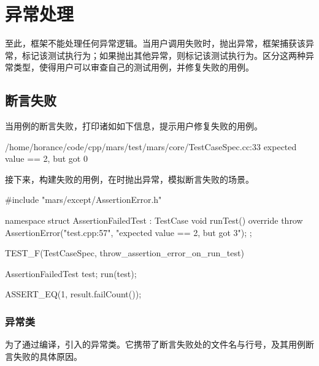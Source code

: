 \section{异常处理}

\begin{content}

至此，框架不能处理任何异常逻辑。当用户调用失败时，抛出异常，框架捕获该异常，标记该测试执行为；如果抛出其他异常，则标记该测试执行为。区分这两种异常类型，使得用户可以审查自己的测试用例，并修复失败的用例。

\subsection{断言失败}

当用例的断言失败，打印诸如如下信息，提示用户修复失败的用例。

\begin{leftbar}
 \begin{python}[caption={测试失败}]
/home/horance/code/cpp/mars/test/mars/core/TestCaseSpec.cc:33
expected value == 2, but got 0
 \end{python}
\end{leftbar}

接下来，构建失败的用例，在时抛出异常，模拟断言失败的场景。

\begin{leftbar}
 \begin{c++}[caption={\ttfamily{test/mars/TestCaseSpec.cc}}]
#include "mars/except/AssertionError.h"

namespace {
  struct AssertionFailedTest : TestCase {
    void runTest() override {
      throw AssertionError("test.cpp:57", "expected value == 2, but got 3");
    }
  };
}

TEST_F(TestCaseSpec, throw_assertion_error_on_run_test) {
  AssertionFailedTest test;
  run(test);

  ASSERT_EQ(1, result.failCount());
}
 \end{c++}
\end{leftbar}

\subsubsection{异常类}

为了通过编译，引入的异常类。它携带了断言失败处的文件名与行号，及其用例断言失败的具体原因。


\end{content}
